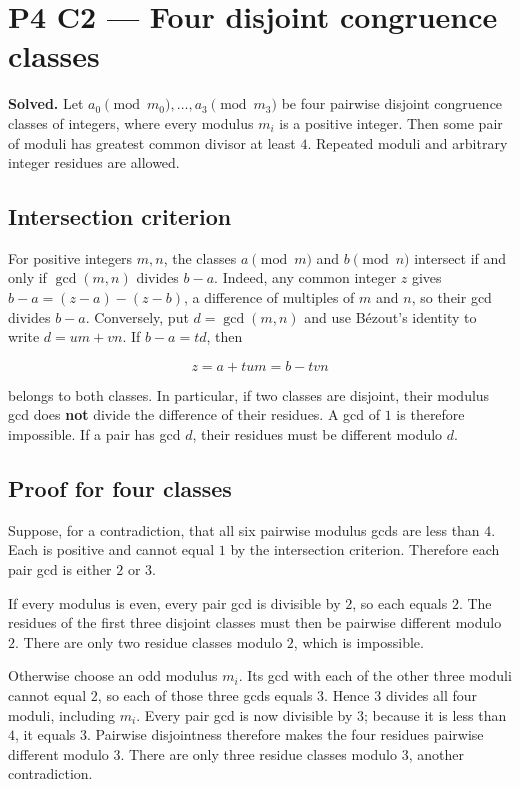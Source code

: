 \documentclass[11pt,a4paper]{article}
\begin{document}
\section{P4 C2 --- Four disjoint congruence classes}\label{p4-c2-four-disjoint-congruence-classes}

\textbf{Solved.} Let \(a_0\pmod{m_0},\ldots,a_3\pmod{m_3}\) be four pairwise disjoint congruence classes of integers, where every modulus \(m_i\) is a positive integer. Then some pair of moduli has greatest common divisor at least \(4\). Repeated moduli and arbitrary integer residues are allowed.

\subsection{Intersection criterion}\label{intersection-criterion}

For positive integers \(m,n\), the classes \(a\pmod m\) and \(b\pmod n\) intersect if and only if \(\gcd(m,n)\) divides \(b-a\). Indeed, any common integer \(z\) gives \(b-a=(z-a)-(z-b)\), a difference of multiples of \(m\) and \(n\), so their gcd divides \(b-a\). Conversely, put \(d=\gcd(m,n)\) and use B\'{e}zout's identity to write \(d=um+vn\). If \(b-a=td\), then

\[
z=a+tum=b-tvn
\]

belongs to both classes. In particular, if two classes are disjoint, their modulus gcd does \textbf{not} divide the difference of their residues. A gcd of \(1\) is therefore impossible. If a pair has gcd \(d\), their residues must be different modulo \(d\).

\subsection{Proof for four classes}\label{proof-for-four-classes}

Suppose, for a contradiction, that all six pairwise modulus gcds are less than \(4\). Each is positive and cannot equal \(1\) by the intersection criterion. Therefore each pair gcd is either \(2\) or \(3\).

If every modulus is even, every pair gcd is divisible by \(2\), so each equals \(2\). The residues of the first three disjoint classes must then be pairwise different modulo \(2\). There are only two residue classes modulo \(2\), which is impossible.

Otherwise choose an odd modulus \(m_i\). Its gcd with each of the other three moduli cannot equal \(2\), so each of those three gcds equals \(3\). Hence \(3\) divides all four moduli, including \(m_i\). Every pair gcd is now divisible by \(3\); because it is less than \(4\), it equals \(3\). Pairwise disjointness therefore makes the four residues pairwise different modulo \(3\). There are only three residue classes modulo \(3\), another contradiction.
\end{document}
